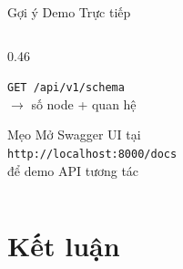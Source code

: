 \documentclass[aspectratio=169, 11pt]{beamer}
\begin{document}
\begin{frame}{Gợi ý Demo Trực tiếp}
\begin{columns}[t]
\begin{column}{0.46\textwidth}
\begin{enumerate}
          \texttt{GET /api/v1/schema}\\
          \textcolor{medBlue}{$\to$ số node + quan hệ}
      \end{enumerate}
      \vspace{0.5em}
      \begin{exampleblock}{Mẹo}
        \scriptsize
        Mở Swagger UI tại\\
        \texttt{http://localhost:8000/docs}\\
        để demo API tương tác
      \end{exampleblock}
    \end{column}
  \end{columns}
\end{frame}

\section{Kết luận}
\end{document}
